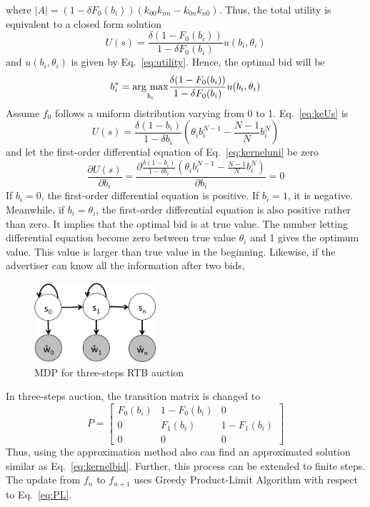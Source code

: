 where $\left| A \right| = (1 - \delta {F_0}({b_i}))({k_{00}}{k_{nn}} - {k_{0n}}{k_{n0}})$. Thus, the total utility is equivalent to a closed form solution
\begin{equation}
\label{eq:keUs}
U(s) = \frac{{\delta (1 - {F_0}({b_i}))}}{{1 - \delta {F_0}({b_i})}}u({b_i},{\theta _i})
\end{equation}
and $u({b_i},{\theta _i})$ is given by Eq.~\ref{eq:utility}. Hence, the optimal bid will be
\begin{equation}
\label{eq:kernelbid}
b^{*}_{i}=\underset{b_i}{\mathop{\rm arg~max}\limits} \frac{{\delta (1 - {F_0}({b_i}))}}{{1 - \delta {F_0}({b_i})}}u({b_i},{\theta _i})
\end{equation}
Assume $f_0$ follows a uniform distribution varying from 0 to 1. Eq.~\ref{eq:keUs} is
\begin{equation}
\label{eq:kerneluni}
U(s) = \frac{{\delta (1 - {b_i})}}{{1 - \delta {b_i}}}({\theta _i}b_i^{N - 1} - \frac{{N - 1}}{N}b_i^N)
\end{equation}
and let the first-order differential equation of Eq.~\ref{eq:kerneluni} be zero 
\begin{equation}
\frac{{\partial U(s)}}{{\partial b_i}} = \frac{{\partial \frac{{\delta (1 - {b_i})}}{{1 - \delta {b_i}}}({\theta _i}b_i^{N - 1} - \frac{{N - 1}}{N}b_i^N)}}{{\partial b_i}} = 0
\end{equation}
If $b_i=0$, the first-order differential equation is positive. If $b_i=1$, it is negative. Meanwhile, if $b_i=\theta_i$, the first-order differential equation is also positive rather than zero. It implies that the optimal bid is at true value. The number letting differential equation become zero between true value $\theta_i$ and 1 gives the optimum value. This value is larger than true value in the beginning. 
Likewise, if the advertiser can know all the information after two bids, 
\begin{figure}[htbp]
\centering
\includegraphics[width=0.4\textwidth]{MDPs_3.png}
\caption{MDP for three-steps RTB auction}
\label{fig:MDPs_3}
\end{figure}
In three-steps auction, the transition matrix is changed to
\begin{equation}
P=\begin{bmatrix}
F_{0}(b_i) & 1-F_{0}(b_i) & 0 \\ 
 0 & F_{1}(b_i) &1-F_{1}(b_i) \\ 
 0 & 0  & 0
\end{bmatrix}
\end{equation}
Thus, using the approximation method also can find an approximated solution similar as Eq.~\ref{eq:kernelbid}. Further, this process can be extended to finite steps. The update from $f_n$ to $f_{n+1}$ uses Greedy Product-Limit Algorithm with respect to Eq.~\ref{eq:PL}. 

